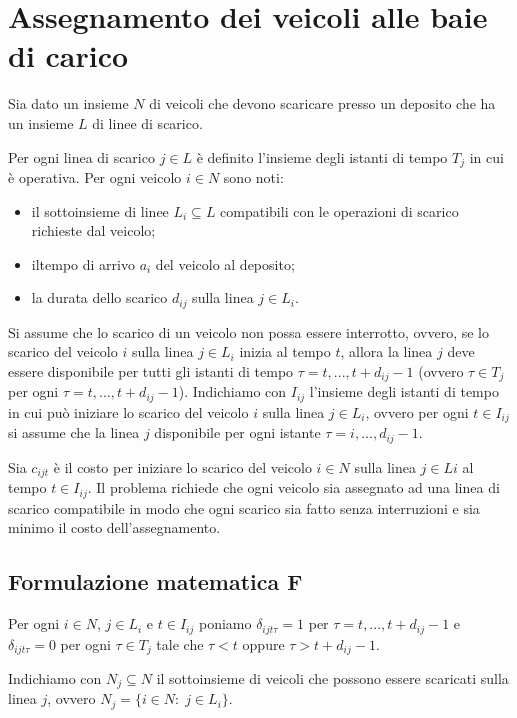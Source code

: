 \section{Assegnamento dei veicoli alle baie di carico}
Sia dato un insieme $N$ di veicoli che devono scaricare presso un deposito che ha un insieme $L$ di linee di scarico.

Per ogni linea di scarico $j\in L$ è definito l'insieme degli istanti di tempo $T_{j}$ in cui è operativa.\newline
Per ogni veicolo $i\in N$ sono noti:
\begin{itemize}
	\item il sottoinsieme di linee $L_{i}\subseteq L$ compatibili con le operazioni di scarico richieste dal veicolo;
	\item iltempo di arrivo $a_{i}$ del veicolo al deposito;
	\item la durata dello scarico $d_{ij}$ sulla linea $j\in L_{i}$.
\end{itemize}
Si assume che lo scarico di un veicolo non possa essere interrotto, ovvero, se lo scarico del veicolo $i$ sulla linea $j\in L_{i}$ inizia al tempo $t$, allora la linea $j$ deve essere disponibile per tutti gli istanti di tempo $\tau=t,...,t+d_{ij}-1$ (ovvero $\tau \in T_{j}$ per ogni $\tau=t,...,t+d_{ij}-1$).
Indichiamo con $I_{ij}$ l'insieme degli istanti di tempo in cui può iniziare lo scarico del veicolo $i$ sulla linea $j\in L_{i}$, ovvero per ogni $t\in I_{ij}$ si assume che la linea $j$ disponibile per ogni istante $\tau=i,...,d_{ij}-1$.

Sia $c_{ijt}$ è il costo per iniziare lo scarico del veicolo $i\in N$ sulla linea $j\in L{i}$ al tempo $t\in I_{ij}$.\newline
Il problema richiede che ogni veicolo sia assegnato ad una linea di scarico compatibile in modo che ogni scarico sia fatto senza interruzioni e sia minimo il costo dell'assegnamento.

\subsection{Formulazione matematica F}
Per ogni $i\in N$, $j\in L_{i}$ e $t\in I_{ij}$ poniamo $\delta_{ijt\tau}=1$ per $\tau=t,...,t+d_{ij}-1$ e $\delta_{ijt\tau}=0$ per ogni $\tau\in T_{j}$ tale che $\tau < t$ oppure $\tau >t+d_{ij}-1$.

Indichiamo con $N_{j}\subseteq N$ il sottoinsieme di veicoli che possono essere scaricati sulla linea $j$, ovvero $N_{j}=\{i\in N:\;j\in L_{i}\}$.

